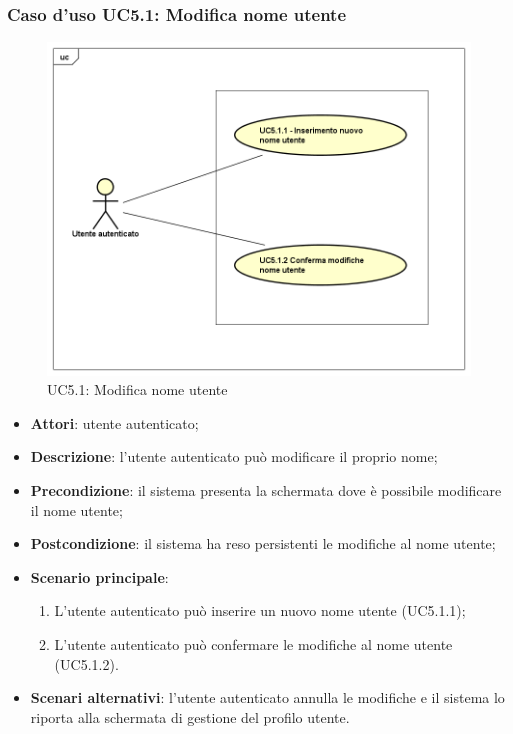 \subsubsection{Caso d'uso UC5.1: Modifica nome utente}
\label{UC5.1}
\begin{figure}[h]
	\centering
	\includegraphics[scale=0.5,keepaspectratio]{UML/UC5_1.png}
	\caption{UC5.1: Modifica nome utente}
\end{figure}
\begin{itemize}
	\item \textbf{Attori}: utente autenticato;
	\item \textbf{Descrizione}: l'utente autenticato può modificare il proprio nome;
	\item \textbf{Precondizione}: il sistema presenta la schermata dove è possibile modificare il nome utente;
	\item \textbf{Postcondizione}: il sistema ha reso persistenti le modifiche al nome utente;
	\item \textbf{Scenario principale}:
		\begin{enumerate}
			\item L'utente autenticato può inserire un nuovo nome utente (UC5.1.1);
			\item L'utente autenticato può confermare le modifiche al nome utente (UC5.1.2).
		\end{enumerate}
	\item \textbf{Scenari alternativi}: l'utente autenticato annulla le modifiche e il sistema lo riporta alla schermata di gestione del profilo utente.
\end{itemize}


